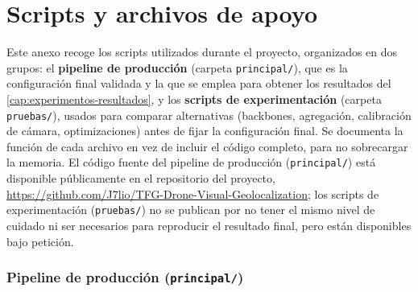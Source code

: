
\chapter{Scripts y archivos de apoyo}
\label{cap:anexo-scripts}

Este anexo recoge los scripts utilizados durante el proyecto, organizados en dos grupos: el \textbf{pipeline de producción} (carpeta \texttt{principal/}), que es la configuración final validada y la que se emplea para obtener los resultados del \autoref{cap:experimentos-resultados}, y los \textbf{scripts de experimentación} (carpeta \texttt{pruebas/}), usados para comparar alternativas (backbones, agregación, calibración de cámara, optimizaciones) antes de fijar la configuración final. Se documenta la función de cada archivo en vez de incluir el código completo, para no sobrecargar la memoria. El código fuente del pipeline de producción (\texttt{principal/}) está disponible públicamente en el repositorio del proyecto, \url{https://github.com/J7lio/TFG-Drone-Visual-Geolocalization}; los scripts de experimentación (\texttt{pruebas/}) no se publican por no tener el mismo nivel de cuidado ni ser necesarios para reproducir el resultado final, pero están disponibles bajo petición.

\subsection*{Pipeline de producción (\texttt{principal/})}

